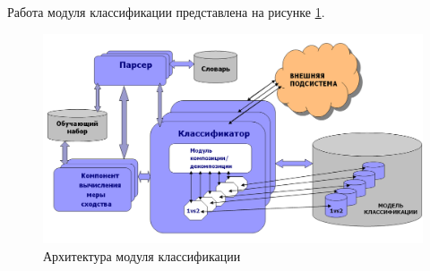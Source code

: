 \documentclass[russian, utf8, emptystyle]{eskdtext}
\begin{document}
Работа модуля классификации представлена на рисунке \ref{fig:arch_module}.
\begin{figure}[h]
	\begin{center}
		\includegraphics[width=14cm]{pic/module2.png}
		\caption{Архитектура модуля классификации}
		\label{fig:arch_module}
	\end{center}
\end{figure}
\end{document}
